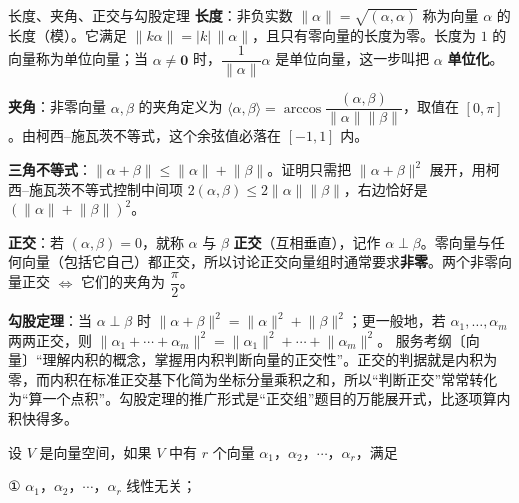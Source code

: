 \begin{fdeep}{长度、夹角、正交与勾股定理}
\textbf{长度}：非负实数 $\lVert\alpha\rVert=\sqrt{(\alpha,\alpha)}$ 称为向量 $\alpha$ 的长度（模）。它满足 $\lVert k\alpha\rVert=\lvert k\rvert\,\lVert\alpha\rVert$，且只有零向量的长度为零。长度为 $1$ 的向量称为单位向量；当 $\alpha\ne\mathbf{0}$ 时，$\dfrac{1}{\lVert\alpha\rVert}\alpha$ 是单位向量，这一步叫把 $\alpha$ \textbf{单位化}。

\textbf{夹角}：非零向量 $\alpha,\beta$ 的夹角定义为 $\langle\alpha,\beta\rangle=\arccos\dfrac{(\alpha,\beta)}{\lVert\alpha\rVert\lVert\beta\rVert}$，取值在 $[0,\pi]$。由柯西–施瓦茨不等式，这个余弦值必落在 $[-1,1]$ 内。

\textbf{三角不等式}：$\lVert\alpha+\beta\rVert\le\lVert\alpha\rVert+\lVert\beta\rVert$。证明只需把 $\lVert\alpha+\beta\rVert^2$ 展开，用柯西–施瓦茨不等式控制中间项 $2(\alpha,\beta)\le2\lVert\alpha\rVert\lVert\beta\rVert$，右边恰好是 $(\lVert\alpha\rVert+\lVert\beta\rVert)^2$。

\textbf{正交}：若 $(\alpha,\beta)=0$，就称 $\alpha$ 与 $\beta$ \textbf{正交}（互相垂直），记作 $\alpha\perp\beta$。零向量与任何向量（包括它自己）都正交，所以讨论正交向量组时通常要求\textbf{非零}。两个非零向量正交 $\iff$ 它们的夹角为 $\dfrac{\pi}{2}$。

\textbf{勾股定理}：当 $\alpha\perp\beta$ 时 $\lVert\alpha+\beta\rVert^2=\lVert\alpha\rVert^2+\lVert\beta\rVert^2$；更一般地，若 $\alpha_1,\dots,\alpha_m$ 两两正交，则 $\lVert\alpha_1+\cdots+\alpha_m\rVert^2=\lVert\alpha_1\rVert^2+\cdots+\lVert\alpha_m\rVert^2$。
\fbref{}服务考纲〔向量〕“理解内积的概念，掌握用内积判断向量的正交性”。正交的判据就是内积为零，而内积在标准正交基下化简为坐标分量乘积之和，所以“判断正交”常常转化为“算一个点积”。勾股定理的推广形式是“正交组”题目的万能展开式，比逐项算内积快得多。
\end{fdeep}





设 $V$ 是向量空间，如果 $V$ 中有 $r$ 个向量 $\alpha_1$，$\alpha_2$，$\cdots$，$\alpha_r$，满足

① $\alpha_1$，$\alpha_2$，$\cdots$，$\alpha_r$ 线性无关；

